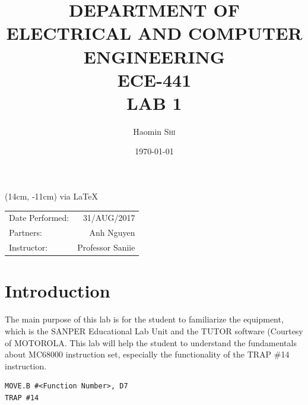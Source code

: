\documentclass{article}
\title{DEPARTMENT OF ELECTRICAL AND COMPUTER ENGINEERING \\ ECE-441 \\ LAB 1} %
\author{Haomin \textsc{Shi}} %
\date{\today} %
\begin{document}
\maketitle %

\begin{textblock*}{3cm}(14cm, -11cm)
	{via  \LaTeX }
\end{textblock*}



\begin{center}
\begin{tabular}{l r}
Date Performed: & 31/AUG/2017 \\ %
Partners: & Anh Nguyen \\ 
Instructor: & Professor Saniie %
\end{tabular}
\end{center}



\section{Introduction}

The main purpose of this lab is for the student to familiarize the equipment, which is the SANPER Educational Lab Unit and the TUTOR software (Courtesy of MOTOROLA\textregistered. This lab will help the student to understand the fundamentals about MC68000 instruction set, especially the functionality of the TRAP \#14 instruction.

\begin{verbatim}MOVE.B #<Function Number>, D7
TRAP #14
\end{verbatim}

\end{document}
